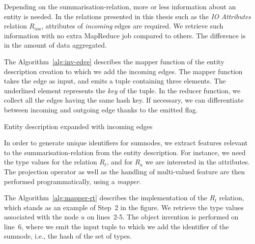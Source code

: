 Depending on the \gls{summarisation-relation}, more or less information about an entity is needed. In the relations presented in this thesis such as the \emph{IO Attributes} relation $R_{ioa}$, attributes of \emph{incoming} edges are required. We retrieve such information with no extra MapReduce job compared to others. The difference is in the amount of data aggregated.

The Algorithm~\ref{alg:inv-edge} describes the mapper function of the entity description creation to which we add the incoming edges. The mapper function takes the edge as input, and emits a tuple containing three elements. The underlined element represents the \emph{key} of the tuple. In the reducer function, we collect all the edges having the same hash key. If necessary, we can differentiate between incoming and outgoing edge thanks to the emitted flag.

\begin{algorithm}
	\DontPrintSemicolon
	\BlankLine
	\caption{Entity description expanded with incoming edges}
	\label{alg:inv-edge}
\end{algorithm}


In order to generate unique identifiers for sumnodes, we extract features relevant to the \gls{summarisation-relation} from the entity description. For instance, we need the type values for the relation $R_t$, and for $R_a$ we are interested in the attributes. The projection operator as well as the handling of multi-valued feature are then performed programmatically, using a \emph{mapper}.

The Algorithm~\ref{alg:mapper-rt} describes the implementation of the $R_t$ relation, which stands as an example of Step~2 in the figure. We retrieve the type values associated with the node $u$ on lines~2-5. The object invention is performed on line~6, where we emit the input tuple to which we add the identifier of the sumnode, i.e., the hash of the set of types.

